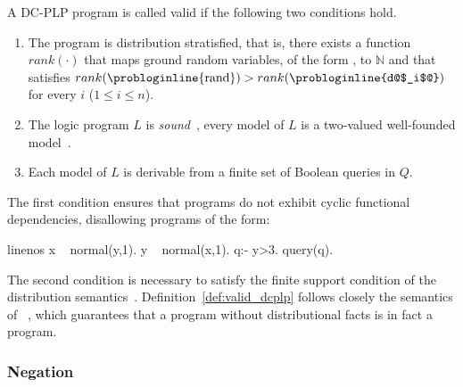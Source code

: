 
\begin{definition} \label{def:valid_dcplp}
	A DC-PLP \dcpprogram program is called valid  if the following two conditions hold.
	\begin{enumerate}
		\item The program \dcpprogram is distribution stratisfied, that is, there exists a function $rank(\cdot)$ that maps ground random variables, of the form , to $\mathbb{N}$ and that satisfies $rank(\text{\probloginline{rand}})>rank(\text{\probloginline{d@$_i$@}})$ for every $i$ ($1\leq i \leq n$). 
		\item The logic program $L$ is {\em sound}~\citep{riguzzi2013well}, \ie every model of $L$ is a two-valued well-founded model~\citep{van1991well,riguzzi2013well}.
		\item Each model of $L$ is derivable from a finite set of Boolean queries in $Q$.
	\end{enumerate}
\end{definition}
The first condition ensures that programs do not exhibit cyclic functional dependencies, disallowing programs of the form:
\begin{problog*}{linenos}
x ~ normal(y,1).
y ~ normal(x,1).
q:- y>3.
query(q).
\end{problog*}
The second condition is necessary to satisfy the finite support condition of the distribution semantics~\citep{sato1995statistical}. Definition~\ref{def:valid_dcplp} follows closely the semantics of \problogsty~\citep{fierens2015inference}, which guarantees that a \dcproblogsty program without distributional facts is in fact a \problogsty program.


\subsubsection{Negation}

